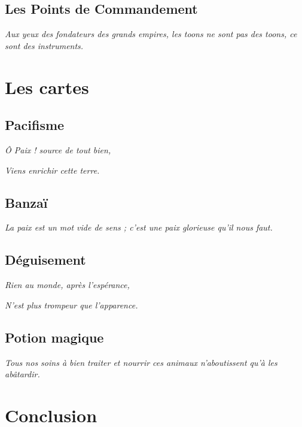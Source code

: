 \subsection{Les Points de Commandement}

\textit{Aux yeux des fondateurs des grands empires, les \textit{toons} ne sont pas
des \textit{toons}, ce sont des instruments.}


\newpage
\section{Les cartes}



\subsection{Pacifisme}
\textit{Ô Paix ! source de tout bien,}

\textit{Viens enrichir cette terre.}\\


\subsection{Banzaï}


\textit{La paix est un mot vide de sens ; c'est une paix glorieuse qu'il nous
faut.}

\subsection{Déguisement}
\textit{Rien au monde, après l'espérance,}

\textit{N'est plus trompeur que l'apparence.}\\

\subsection{Potion magique}

\textit{Tous nos soins à bien traiter et nourrir ces animaux n'aboutissent
qu'à les abâtardir.}

\newpage
\section{Conclusion}

